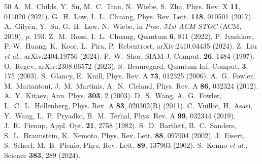 \documentclass[12pt]{iopart}
\begin{document}
\begin{thebibliography}{50}
 A.~M.~Childs, Y.~Su, M.~C.~Tran, N.~Wiebe, S.~Zhu,
Phys. Rev. X \textbf{11}, 011020 (2021).
 G.~H.~Low, I.~L.~Chuang, Phys. Rev. Lett. \textbf{118},
010501 (2017).
 A.~Gily\'en, Y.~Su, G.~H.~Low, N.~Wiebe, in {\it
Proc. 51st ACM STOC} (ACM, 2019), p. 193.
 Z.~M.~Rossi, I.~L.~Chuang, Quantum \textbf{6}, 811
(2022).
 P.~Ivashkov, P.-W.~Huang, K.~Koor, L.~Pira,
P.~Rebentrost, arXiv:2410.04435 (2024).
 Z.~Liu \emph{et al.}, arXiv:2404.19756 (2024).
 P.~W.~Shor, SIAM J. Comput. \textbf{26}, 1484 (1997).
 O.~Regev, arXiv:2308.06572 (2023).
 S.~Beauregard, Quantum Inf. Comput. \textbf{3},
175 (2003).
 S.~Glancy, E.~Knill, Phys. Rev. A \textbf{73}, 012325
(2006).
 A.~G.~Fowler, M.~Mariantoni, J.~M.~Martinis,
A.~N.~Cleland, Phys. Rev. A \textbf{86}, 032324 (2012).
 A.~Y.~Kitaev, Ann. Phys. \textbf{303}, 2 (2003).
 D.~S.~Wang, A.~G.~Fowler, L.~C.~L.~Hollenberg,
Phys. Rev. A \textbf{83}, 020302(R) (2011).
 C.~Vuillot, H.~Asasi, Y.~Wang, L.~P.~Pryadko,
B.~M.~Terhal, Phys. Rev. A \textbf{99}, 032344 (2019).
 J.~R.~Fienup, Appl. Opt. \textbf{21}, 2758 (1982).
 S.~D.~Bartlett, B.~C.~Sanders, S.~L.~Braunstein,
K.~Nemoto, Phys. Rev. Lett. \textbf{88}, 097904 (2002).
 J.~Eisert, S.~Scheel, M.~B.~Plenio, Phys. Rev. Lett.
\textbf{89}, 137903 (2002).
 S.~Konno \emph{et al.}, Science \textbf{383}, 289
(2024).
\end{thebibliography}
\end{document}
